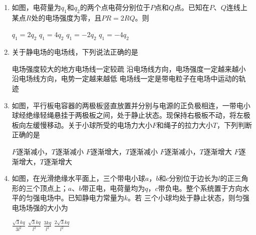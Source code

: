 \begin{enumerate}[leftmargin=0em]
\item
{}
如图，电荷量为$ q_{1} $和$ q_{2} $的两个点电荷分别位于$ P $点和$ Q $点。已知在$ P $、$ Q $连线上某点$ R $处的电场强度为零，且$ PR=2RQ $。则  
\begin{figure}[h!]
\centering

\end{figure}


\fourchoices
{$ q_{1} =2 q_{2} $ }
{$ q_{1} =4 q_{2} $}
{$ q_{1} =-2 q_{2} $}
{$ q_{1} =-4 q_{2} $}





\item
{}
关于静电场的电场线，下列说法正确的是  


\fourchoices
{电场强度较大的地方电场线一定较疏}
{沿电场线方向，电场强度一定越来越小}
{沿电场线方向，电势一定越来越低}
{电场线一定是带电粒子在电场中运动的轨迹}





\item
{}
如图，平行板电容器的两极板竖直放置并分别与电源的正负极相连，一带电小球经绝缘轻绳悬挂于两极板之间，处于静止状态。现保持右极板不动，将左极板向左缓慢移动。关于小球所受的电场力大小$ F $和绳子的拉力大小$ T $，下列判断正确的是  
\begin{figure}[h!]
\centering

\end{figure}

\fourchoices
{$ F $逐渐减小，$ T $逐渐减小}
{$ F $逐渐增大，$ T $逐渐减小}
{$ F $逐渐减小，$ T $逐渐增大}
{$ F $逐渐增大，$ T $逐渐增大}


\item
{}
如图，在光滑绝缘水平面上，三个带电小球$ a $，$ b $和$ c $分别位于边长为$ l $的正三角形的三个顶点上；$ a $、$ b $带正电，电荷量均为$ q $，$ c $带负电。整个系统置于方向水平的匀强电场中。已知静电力常量为$ k $。若 三个小球均处于静止状态，则匀强电场场强的大小为  
\begin{figure}[h!]
\centering

\end{figure}
\fourchoices
{$\frac { \sqrt { 3 } k q } { 3 l ^ { 2 } }$}
{$\frac { \sqrt { 3 } k q } { l ^ { 2 } }$}
{$\frac { 3 k q } { l ^ { 2 } }$}
{$\frac { 2 \sqrt { 3 } k q } { l ^ { 2 } }$}




\end{enumerate}
